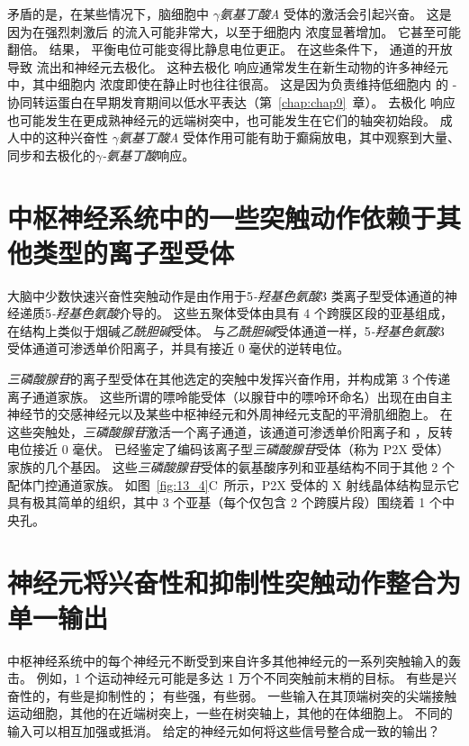 矛盾的是，在某些情况下，脑细胞中 \textit{$\gamma$氨基丁酸A} 受体的激活会引起兴奋。
这是因为在强烈刺激后  的流入可能非常大，以至于细胞内  浓度显著增加。
它甚至可能翻倍。
结果， 平衡电位可能变得比静息电位更正。
在这些条件下， 通道的开放导致  流出和神经元去极化。
这种去极化  响应通常发生在新生动物的许多神经元中，其中细胞内  浓度即使在静止时也往往很高。
这是因为负责维持低细胞内  的 - 协同转运蛋白在早期发育期间以低水平表达（第~\ref{chap:chap9}~章）。
去极化  响应也可能发生在更成熟神经元的远端树突中，也可能发生在它们的轴突初始段。
成人中的这种兴奋性 \textit{$\gamma$氨基丁酸A} 受体作用可能有助于癫痫放电，其中观察到大量、同步和去极化的\textit{$\gamma$-氨基丁酸}响应。



\section{中枢神经系统中的一些突触动作依赖于其他类型的离子型受体}

大脑中少数快速兴奋性突触动作是由作用于5\textit{-羟基色氨酸}3 类离子型受体通道的神经递质5\textit{-羟基色氨酸}介导的。
这些五聚体受体由具有 4 个跨膜区段的亚基组成，在结构上类似于烟碱\textit{乙酰胆碱}受体。
与\textit{乙酰胆碱}受体通道一样，5\textit{-羟基色氨酸}3 受体通道可渗透单价阳离子，并具有接近 0 毫伏的逆转电位。


\textit{三磷酸腺苷}的离子型受体在其他选定的突触中发挥兴奋作用，并构成第 3 个传递离子通道家族。
这些所谓的嘌呤能受体（以腺苷中的嘌呤环命名）出现在由自主神经节的交感神经元以及某些中枢神经元和外周神经元支配的平滑肌细胞上。
在这些突触处，\textit{三磷酸腺苷}激活一个离子通道，该通道可渗透单价阳离子和 ，反转电位接近 0 毫伏。
已经鉴定了编码该离子型\textit{三磷酸腺苷}受体（称为 P2X 受体）家族的几个基因。
这些\textit{三磷酸腺苷}受体的氨基酸序列和亚基结构不同于其他 2 个配体门控通道家族。
如图~\ref{fig:13_4}C~所示，P2X 受体的 X 射线晶体结构显示它具有极其简单的组织，其中 3 个亚基（每个仅包含 2 个跨膜片段）围绕着 1 个中央孔。



\section{神经元将兴奋性和抑制性突触动作整合为单一输出}

中枢神经系统中的每个神经元不断受到来自许多其他神经元的一系列突触输入的轰击。
例如，1 个运动神经元可能是多达 1 万个不同突触前末梢的目标。
有些是兴奋性的，有些是抑制性的；
有些强，有些弱。
一些输入在其顶端树突的尖端接触运动细胞，其他的在近端树突上，一些在树突轴上，其他的在体细胞上。
不同的输入可以相互加强或抵消。
给定的神经元如何将这些信号整合成一致的输出？


